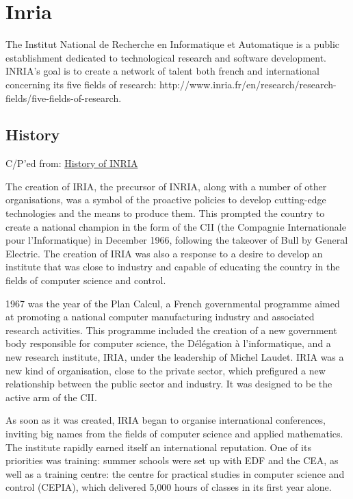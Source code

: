 \newpage
\section{Inria}

The Institut National de Recherche en Informatique et Automatique is a public establishment dedicated to technological research and software development. INRIA's goal is to create a network of talent both french and international concerning its five fields of research: http://www.inria.fr/en/research/research-fields/five-fields-of-research. 

\subsection{History}

C/P'ed from: \href{http://www.inria.fr/en/institute/inria-in-brief/history-of-inria}{History of INRIA}

The creation of IRIA, the precursor of INRIA, along with a number of other organisations, was a symbol of the proactive policies to develop cutting-edge technologies and the means to produce them. This prompted the country to create a national champion in the form of the CII (the Compagnie Internationale pour l'Informatique) in December 1966, following the takeover of Bull by General Electric. The creation of IRIA was also a response to a desire to develop an institute that was close to industry and capable of educating the country in the fields of computer science and control.


1967 was the year of the Plan Calcul, a French governmental programme aimed at promoting a national computer manufacturing industry and associated research activities. This programme included the creation of a new government body responsible for computer science, the Délégation à l'informatique, and a new research institute, IRIA, under the leadership of Michel Laudet. IRIA was a new kind of organisation, close to the private sector, which prefigured a new relationship between the public sector and industry. It was designed to be the active arm of the CII.


As soon as it was created, IRIA began to organise international conferences, inviting big names from the fields of computer science and applied mathematics. The institute rapidly earned itself an international reputation. One of its priorities was training: summer schools were set up with EDF and the CEA, as well as a training centre: the centre for practical studies in computer science and control (CEPIA), which delivered 5,000 hours of classes in its first year alone.


